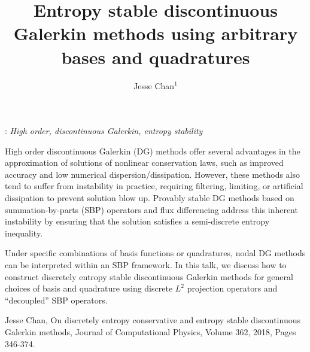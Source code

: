 \documentclass[12pt]{eccm-ecfd_abstract}
\title{Entropy stable discontinuous Galerkin methods using arbitrary bases and quadratures}
\author{Jesse Chan$^{1}$}
\begin{document}
: {\it High order, discontinuous Galerkin, entropy stability}
\vskip0.5cm

High order discontinuous Galerkin (DG) methods offer several advantages in the approximation of solutions of nonlinear conservation laws, such as improved accuracy and low numerical dispersion/dissipation.  However, these methods also tend to suffer from instability in practice, requiring filtering, limiting, or artificial dissipation to prevent solution blow up.  Provably stable DG methods based on summation-by-parts (SBP) operators and flux differencing address this inherent instability by ensuring that the solution satisfies a semi-discrete entropy inequality.  

Under specific combinations of basis functions or quadratures, nodal DG methods can be interpreted within an SBP framework.  In this talk, we discuss how to construct discretely entropy stable discontinuous Galerkin methods for general choices of basis and quadrature using discrete $L^2$ projection operators and ``decoupled'' SBP operators.  %


\begin{thebibliography}{99}
  Jesse Chan, 
On discretely entropy conservative and entropy stable discontinuous Galerkin methods, Journal of Computational Physics, Volume 362, 2018, Pages 346-374.
\end{thebibliography}
\end{document}
